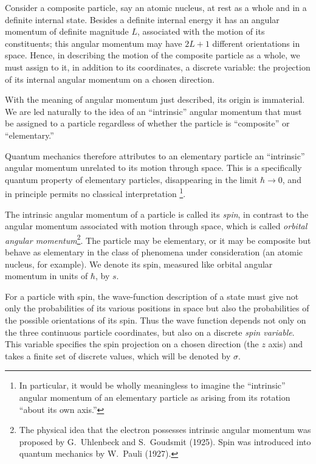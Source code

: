 Consider a composite particle, say an atomic nucleus, at rest as a whole and
in a definite internal state. Besides a definite internal energy it has an
angular momentum of definite magnitude $L$, associated with the motion of its
constituents; this angular momentum may have $2L+1$ different orientations in
space. Hence, in describing the motion of the composite particle as a whole,
we must assign to it, in addition to its coordinates, a discrete variable:
the projection of its internal angular momentum on a chosen direction.

With the meaning of angular momentum just described, its origin is immaterial.
We are led naturally to the idea of an ``intrinsic'' angular momentum that
must be assigned to a particle regardless of whether the particle is
``composite'' or ``elementary.''

Quantum mechanics therefore attributes to an elementary particle an
``intrinsic'' angular momentum unrelated to its motion through space. This is
a specifically quantum property of elementary particles, disappearing in the
limit $\hbar\to0$, and in principle permits no classical interpretation
\footnote{In particular, it would be wholly meaningless to imagine the
``intrinsic'' angular momentum of an elementary particle as arising from its
rotation ``about its own axis.''}.

The intrinsic angular momentum of a particle is called its \emph{spin}, in
contrast to the angular momentum associated with motion through space, which
is called \emph{orbital angular momentum}\footnote{The physical idea that the
electron possesses intrinsic angular momentum was proposed by G.~Uhlenbeck
and S.~Goudsmit (1925). Spin was introduced into quantum mechanics by
W.~Pauli (1927).}. The particle may be elementary, or it may be composite but
behave as elementary in the class of phenomena under consideration (an atomic
nucleus, for example). We denote its spin, measured like orbital angular
momentum in units of $\hbar$, by $s$.

For a particle with spin, the wave-function description of a state must give
not only the probabilities of its various positions in space but also the
probabilities of the possible orientations of its spin. Thus the wave function
depends not only on the three continuous particle coordinates, but also on a
discrete \emph{spin variable}. This variable specifies the spin projection on
a chosen direction (the $z$ axis) and takes a finite set of discrete values,
which will be denoted by $\sigma$.

